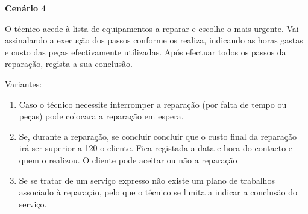 \documentclass[../relatorio.tex]{subfiles}
\begin{document}
\textbf{Cenário 4} \label{cenario_4}

O técnico acede à lista de equipamentos a reparar e escolhe o mais urgente. Vai assinalando a execução dos passos conforme os realiza, indicando
as horas gastas e custo das peças efectivamente utilizadas. Após efectuar todos os passos da reparação, regista a sua conclusão.

Variantes:
\begin{enumerate}
    \item Caso o técnico necessite interromper a reparação (por falta de tempo ou peças) pode colocara a reparação em espera.
    \item Se, durante a reparação, se concluir concluir que o custo final da reparação irá ser superior a 120%
          o cliente. Fica registada a data e hora do contacto e quem o realizou. O cliente pode aceitar ou não a reparação
    \item Se se tratar de um serviço expresso não existe um plano de trabalhos associado à reparação,
          pelo que o técnico se limita a indicar a conclusão do serviço.
\end{enumerate}
\end{document}
